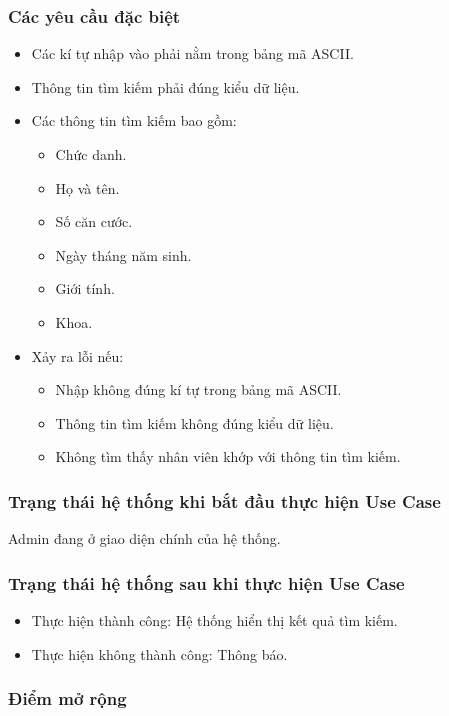 \subsubsection{Các yêu cầu đặc biệt}
\begin{itemize}
  \item Các kí tự nhập vào phải nằm trong bảng mã ASCII.
  \item Thông tin tìm kiếm phải đúng kiểu dữ liệu.
  \item Các thông tin tìm kiếm bao gồm:
    \begin{itemize}
      \item Chức danh.
      \item Họ và tên.
      \item Số căn cước.
      \item Ngày tháng năm sinh.
      \item Giới tính.
      \item Khoa.
    \end{itemize}
  \item Xảy ra lỗi nếu:
    \begin{itemize}
      \item Nhập không đúng kí tự trong bảng mã ASCII.
      \item Thông tin tìm kiếm không đúng kiểu dữ liệu.
      \item Không tìm thấy nhân viên khớp với thông tin tìm kiếm.
    \end{itemize}
\end{itemize}

\subsubsection{Trạng thái hệ thống khi bắt đầu thực hiện Use Case}
Admin đang ở giao diện chính của hệ thống.

\subsubsection{Trạng thái hệ thống sau khi thực hiện Use Case}
\begin{itemize}
  \item Thực hiện thành công: Hệ thống hiển thị kết quả tìm kiếm.
  \item Thực hiện không thành công: Thông báo.
\end{itemize}

\subsubsection{Điểm mở rộng}